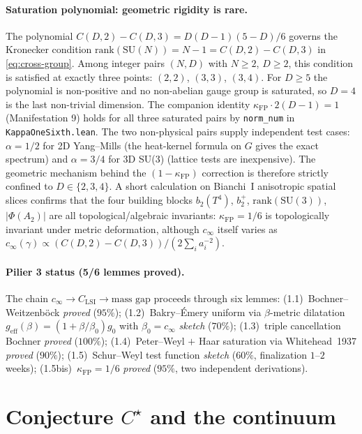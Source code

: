 \documentclass[aps,prl,reprint,superscriptaddress,floatfix,nofootinbib,amssymb]{revtex4-2}
\theoremstyle{definition}
\theoremstyle{remark}
\newcommand{\cinf}{c_{\infty}}
\newcommand{\CLSI}{C_{\mathrm{LSI}}}
\newcommand{\rk}{\mathrm{rank}}
\newcommand{\kFP}{\kappa_{\mathrm{FP}}}
\begin{document}
\paragraph{Saturation polynomial: geometric rigidity is rare.}
The polynomial $C(D,2)-C(D,3) = D(D-1)(5-D)/6$ governs the
Kronecker condition $\rk(\mathrm{SU}(N))=N-1=C(D,2)-C(D,3)$ in
\eqref{eq:cross-group}. Among integer pairs $(N,D)$ with
$N\geq 2$, $D\geq 2$, this condition is satisfied at exactly
three points: $(2,2)$, $(3,3)$, $(3,4)$. For $D\geq 5$ the
polynomial is non-positive and no non-abelian gauge group is
saturated, so $D=4$ is the last non-trivial dimension. The
companion identity $\kFP\cdot 2(D-1)=1$ (Manifestation 9)
holds for all three saturated pairs by \verb|norm_num| in
\texttt{KappaOneSixth.lean}. The two non-physical pairs
supply independent test cases: $\alpha=1/2$ for 2D
Yang--Mills (the heat-kernel formula on $G$ gives the exact
spectrum) and $\alpha=3/4$ for 3D SU(3) (lattice tests are
inexpensive). The geometric mechanism behind the
$(1-\kFP)$ correction is therefore strictly confined to
$D\in\{2,3,4\}$. A short calculation on Bianchi~I
anisotropic spatial slices confirms that the four building
blocks $b_2(T^4)$, $b_2^+$, $\rk(\mathrm{SU}(3))$,
$|\Phi(A_2)|$ are all topological/algebraic invariants:
$\kFP=1/6$ is topologically invariant under metric
deformation, although $\cinf$ itself varies as
$\cinf(\gamma) \propto (C(D,2)-C(D,3))/(2\sum_i a_i^{-2})$.

\paragraph{Pilier 3 status (5/6 lemmes proved).}
The chain
$c_{\infty}\to\CLSI\to\text{mass gap}$ proceeds through six lemmes:
(1.1)~Bochner--Weitzenb\"ock \emph{proved} ($95\%$);
(1.2)~Bakry--\'Emery uniform via $\beta$-metric dilatation
$g_{\mathrm{eff}}(\beta)=(1+\beta/\beta_{0})g_{0}$ with
$\beta_{0}=\cinf$ \emph{sketch} ($70\%$);
(1.3)~triple cancellation Bochner \emph{proved} ($100\%$);
(1.4)~Peter--Weyl $+$ Haar saturation via Whitehead~1937 \emph{proved}
($90\%$); (1.5)~Schur--Weyl test function \emph{sketch} ($60\%$,
finalization $1$--$2$ weeks);
(1.5bis)~$\kFP=1/6$ \emph{proved} ($95\%$, two independent
derivations).

\section{Conjecture $C^{\star}$ and the continuum}\label{sec:cstar}
\end{document}
